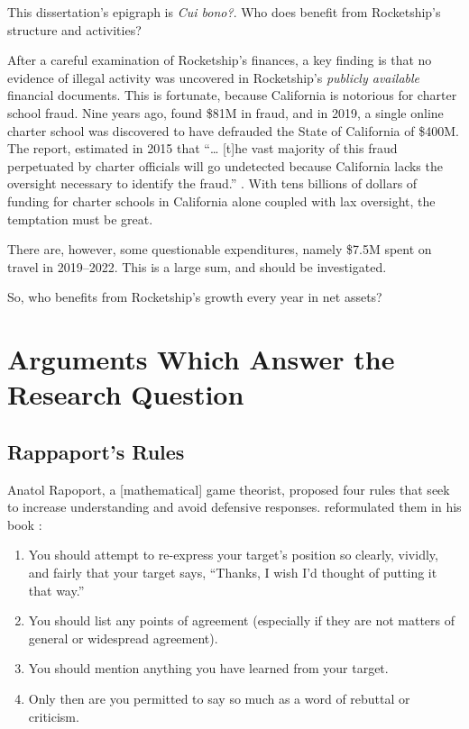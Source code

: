 This dissertation's epigraph is \textit{Cui bono?}. Who does benefit from Rocketship's structure and activities?

After a careful examination of Rocketship's finances, a key finding is that no evidence of illegal activity was uncovered in Rocketship's \textit{publicly available} financial documents. This is fortunate, because California is notorious for charter school fraud. Nine years ago, \textcite{CPD2015} found \$81M in fraud, and in 2019, a single online charter school was discovered to have defrauded the State of California of \$400M. The report,  estimated in 2015 that ``\ldots{} [t]he vast majority of this fraud perpetuated by charter officials will go undetected because California lacks the oversight necessary to identify the fraud.'' \parencite[2]{CPD2015}. With tens billions of dollars of funding for charter schools in California alone coupled with lax oversight, the temptation must be great. 

There are, however, some questionable expenditures, namely \$7.5M spent on travel in 2019–2022. This is a large sum, and should be investigated.

So, who benefits from Rocketship's growth every year in net assets?

\section{Arguments Which Answer the Research Question}%
\label{sec:appr-answ-rese-quest}\indent%

\subsection{Rappaport's Rules}%
\label{sec:rappaports-rules}\indent%

Anatol Rapoport, a [mathematical] game theorist, proposed four rules that seek to increase understanding and avoid defensive responses.  reformulated them in his book  \parencite{Dennett2013}:
\begin{enumerate}[topsep=0.3\baselineskip,itemsep=0.25\baselineskip]
  \item You should attempt to re-express your target’s position so clearly, vividly, and fairly that your target says, “Thanks, I wish I’d thought of putting it that way.”
  \item You should list any points of agreement (especially if they are not matters of general or widespread agreement).
  \item You should mention anything you have learned from your target.
  \item Only then are you permitted to say so much as a word of rebuttal or criticism.
\end{enumerate}
\medskip

